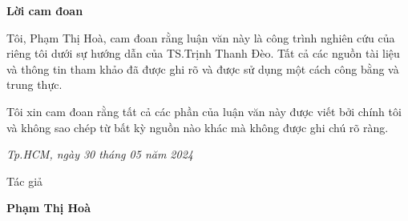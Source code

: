 
\begin{center}
\LARGE{\textbf{Lời cam đoan}}
\end{center}

Tôi, Phạm Thị Hoà, cam đoan rằng luận văn này là công trình nghiên cứu của riêng tôi dưới sự hướng dẫn của TS.Trịnh Thanh Đèo. Tất cả các nguồn tài liệu và thông tin tham khảo đã được ghi rõ và được sử dụng một cách công bằng và trung thực.

Tôi xin cam đoan rằng tất cả các phần của luận văn này được viết bởi chính tôi và không sao chép từ bất kỳ nguồn nào khác mà không được ghi chú rõ ràng.


\begin{flushright}
{\it Tp.HCM, ngày 30 tháng 05 năm 2024}

Tác giả\hskip 2cm\quad

\vskip 2cm

{\bf Phạm Thị Hoà} \hskip 1cm \quad\ 
 \end{flushright}
\thispagestyle{empty}
